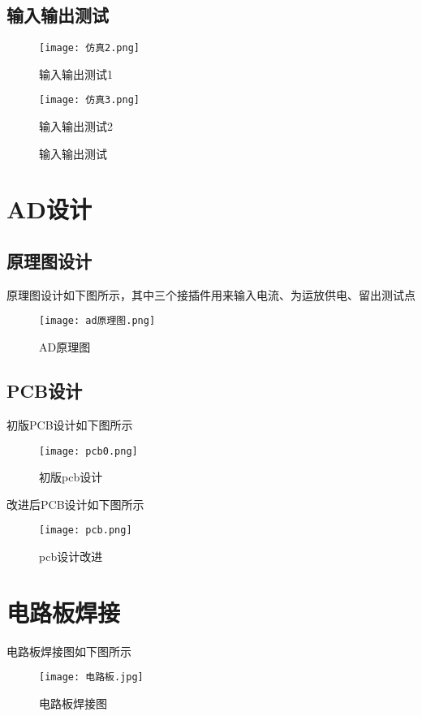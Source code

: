 \documentclass{zjureport}
\begin{document}
\newpage
\subsection{输入输出测试}
\begin{figure}[h]
  \begin{minipage}{0.45\linewidth}
    \centering
    \texttt{[image: 仿真2.png]}
    \caption{输入输出测试1}
  \end{minipage}
  \begin{minipage}{0.45\linewidth}
    \centering
    \texttt{[image: 仿真3.png]}
    \caption{输入输出测试2}
  \end{minipage}
  \caption{输入输出测试}
\end{figure}

\section{AD设计}
\subsection{原理图设计}
原理图设计如下图所示，其中三个接插件用来输入电流、为运放供电、留出测试点
\begin{figure}[H]
  \begin{center}
  \texttt{[image: ad原理图.png]}
  \end{center}
  \caption{AD原理图}
\end{figure}

\subsection{PCB设计}
初版PCB设计如下图所示
\begin{figure}[H]
  \begin{center}
  \texttt{[image: pcb0.png]}
  \end{center}
  \caption{初版pcb设计}
\end{figure}

改进后PCB设计如下图所示
\begin{figure}[H]
  \begin{center}
  \texttt{[image: pcb.png]}
  \end{center}
  \caption{pcb设计改进}
\end{figure}

\section{电路板焊接}
电路板焊接图如下图所示
\begin{figure}[H]
  \begin{center}
  \texttt{[image: 电路板.jpg]}
  \end{center}
  \caption{电路板焊接图}
\end{figure}
\end{document}
